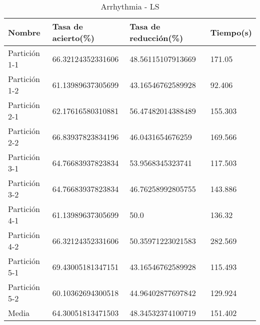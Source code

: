\begin{table}[H]
	\centering
	\caption{Arrhythmia - LS}
	\label{ARRH-LS}
	\begin{tabular}{l|lll}
		Nombre        & Tasa de acierto(\%) & Tasa de reducción(\%) & Tiempo(s) \\ \hline
		Partición 1-1 & 66.32124352331606   & 48.56115107913669     & 171.05    \\
		Partición 1-2 & 61.13989637305699   & 43.16546762589928     & 92.406    \\
		Partición 2-1 & 62.17616580310881   & 56.47482014388489     & 155.303   \\
		Partición 2-2 & 66.83937823834196   & 46.0431654676259      & 169.566   \\
		Partición 3-1 & 64.76683937823834   & 53.9568345323741      & 117.503   \\
		Partición 3-2 & 64.76683937823834   & 46.76258992805755     & 143.886   \\
		Partición 4-1 & 61.13989637305699   & 50.0                  & 136.32    \\
		Partición 4-2 & 66.32124352331606   & 50.35971223021583     & 282.569   \\
		Partición 5-1 & 69.43005181347151   & 43.16546762589928     & 115.493   \\
		Partición 5-2 & 60.10362694300518   & 44.96402877697842     & 129.924   \\ \hline
		Media         & 64.30051813471503   & 48.34532374100719     & 151.402  
	\end{tabular}
\end{table}